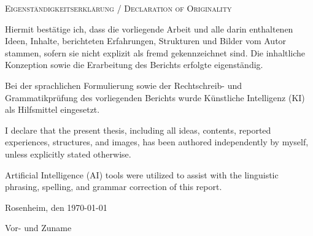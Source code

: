 {
\large
\thispagestyle{empty}
\vspace*{\fill}

\noindent
\textsc{Eigenständigkeitserklärung / Declaration of Originality}

Hiermit bestätige ich, dass die vorliegende Arbeit und alle darin enthaltenen Ideen, Inhalte, berichteten Erfahrungen, Strukturen und Bilder vom Autor stammen, sofern sie nicht explizit als fremd gekennzeichnet sind. Die inhaltliche Konzeption sowie die Erarbeitung des Berichts erfolgte eigenständig.

Bei der sprachlichen Formulierung sowie der Rechtschreib- und Grammatikprüfung des vorliegenden Berichts wurde Künstliche Intelligenz (KI) als Hilfsmittel eingesetzt.

\vspace{1cm}
\noindent
I declare that the present thesis, including all ideas, contents, reported experiences, structures, and images, has been authored independently by myself, unless explicitly stated otherwise.

Artificial Intelligence (AI) tools were utilized to assist with the linguistic phrasing, spelling, and grammar correction of this report.
\bigskip

\noindent
Rosenheim, den \today

\vspace*{2cm}

\noindent
Vor- und Zuname
}

